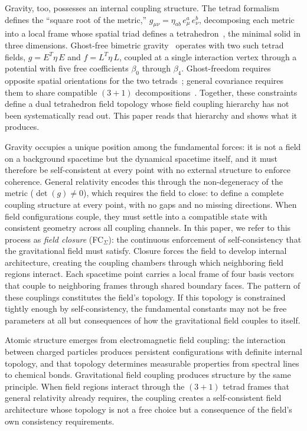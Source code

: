 \documentclass[aps,prd,preprint,superscriptaddress,showpacs,preprintnumbers,amsmath,amssymb,nofootinbib]{revtex4-2}
\begin{document}
Gravity, too, possesses an internal coupling structure. The tetrad formalism~\cite{mtw1973,wald1984} defines the ``square root of the metric,'' $g_{\mu\nu} = \eta_{ab}\,e^a_\mu\,e^b_\nu$, decomposing each metric into a local frame whose spatial triad defines a tetrahedron~\cite{barbieri1998}, the minimal solid in three dimensions. Ghost-free bimetric gravity~\cite{hassan2012,hinterbichler2012} operates with two such tetrad fields, $g = E^T\eta\,E$ and $f = L^T\eta\,L$, coupled at a single interaction vertex through a potential with five free coefficients $\beta_0$ through $\beta_4$. Ghost-freedom requires opposite spatial orientations for the two tetrads~\cite{alexander2014}; general covariance requires them to share compatible $(3{+}1)$ decompositions~\cite{hassankocic2018}. Together, these constraints define a dual tetrahedron field topology whose field coupling hierarchy has not been systematically read out. This paper reads that hierarchy and shows what it produces.

Gravity occupies a unique position among the fundamental forces: it is not a field on a background spacetime but the dynamical spacetime itself, and it must therefore be self-consistent at every point with no external structure to enforce coherence. General relativity encodes this through the non-degeneracy of the metric ($\det(g) \neq 0$), which requires the field to close: to define a complete coupling structure at every point, with no gaps and no missing directions. When field configurations couple, they must settle into a compatible state with consistent geometry across all coupling channels. In this paper, we refer to this process as \emph{field closure} (FC$_{\Sigma}$): the continuous enforcement of self-consistency that the gravitational field must satisfy. Closure forces the field to develop internal architecture, creating the coupling chambers through which neighboring field regions interact. Each spacetime point carries a local frame of four basis vectors that couple to neighboring frames through shared boundary faces. The pattern of these couplings constitutes the field's topology. If this topology is constrained tightly enough by self-consistency, the fundamental constants may not be free parameters at all but consequences of how the gravitational field couples to itself.

Atomic structure emerges from electromagnetic field coupling: the interaction between charged particles produces persistent configurations with definite internal topology, and that topology determines measurable properties from spectral lines to chemical bonds. Gravitational field coupling produces structure by the same principle. When field regions interact through the $(3{+}1)$ tetrad frames that general relativity already requires, the coupling creates a self-consistent field architecture whose topology is not a free choice but a consequence of the field's own consistency requirements.
\end{document}
